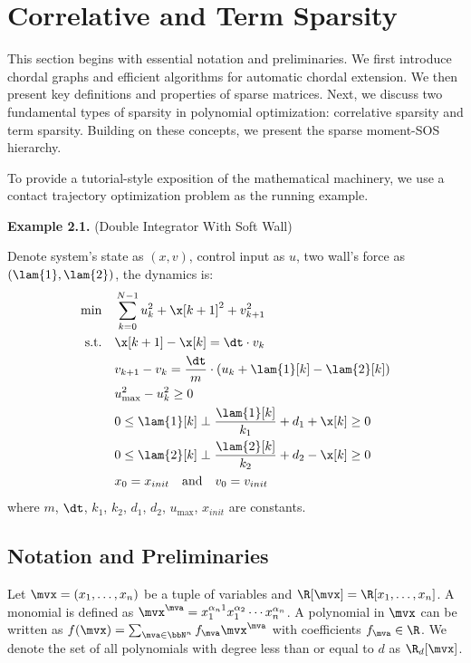 
\section{Correlative and Term Sparsity}
\label{sec:general-sparsity}

This section begins with essential notation and preliminaries. We first introduce chordal graphs and efficient algorithms for automatic chordal extension. We then present key definitions and properties of sparse matrices. Next, we discuss two fundamental types of sparsity in polynomial optimization: correlative sparsity and term sparsity. Building on these concepts, we present the sparse moment-SOS hierarchy.

To provide a tutorial-style exposition of the mathematical machinery, we use a contact trajectory optimization problem as the running example.

\textbf{Example 2.1.} (Double Integrator With Soft Wall)


\begin{example}
	\label{ex:di-soft-wall}
	Denote system's state as $(x, v)$, control input as $u$, two wall's force as $(\lam{1}, \lam{2})$, the dynamics is:
\begin{align}
	\min \quad & \sum_{k = 0} ^ {N - 1} u_k^2 + \x[k+1]^2 + v_{k+1}^2 \\
	\text{s.t.} \quad & \x[k+1] - \x[k] = \dt \cdot v_k \\
	& v_{k+1} - v_k = \frac{\dt}{m} \cdot (u_k + \lam{1}[k] - \lam{2}[k]) \\
	& u_{\max}^2 - u_k^2 \ge 0 \\
	& 0 \le \lam{1}[k] \perp \frac{\lam{1}[k] }{k_1} + d_1 + \x[k] \ge 0 \\
	& 0 \le \lam{2}[k] \perp \frac{\lam{2}[k] }{k_2} + d_2 - \x[k] \ge 0 \\
	& x_0 = x_{init} \quad \text{and} \quad v_0 = v_{init}
\end{align} 
where $m$, $\dt$, $k_1$, $k_2$, $d_1$, $d_2$, $u_{\max}$, $x_{init}$ are constants.
\end{example}

\subsection{Notation and Preliminaries}	

Let $\mvx = (x_1, \dots, x_n)$ be a tuple of variables and $\R[\mvx] = \R[x_1,\dots,x_n]$. A monomial is defined as $\mvx^\mva = x_1^{\alpha_ n1}x_1^{\alpha_2} \cdots x_n^{\alpha_n}$. A polynomial in $\mvx$ can be written as $f(\mvx) = \sum_{\mva \in \bbN^n} f_\mva \mvx^\mva$ with coefficients $f_\mva \in \R$. We denote the set of all polynomials with degree less than or equal to $d$ as $\R_{d}[\mvx]$. 

